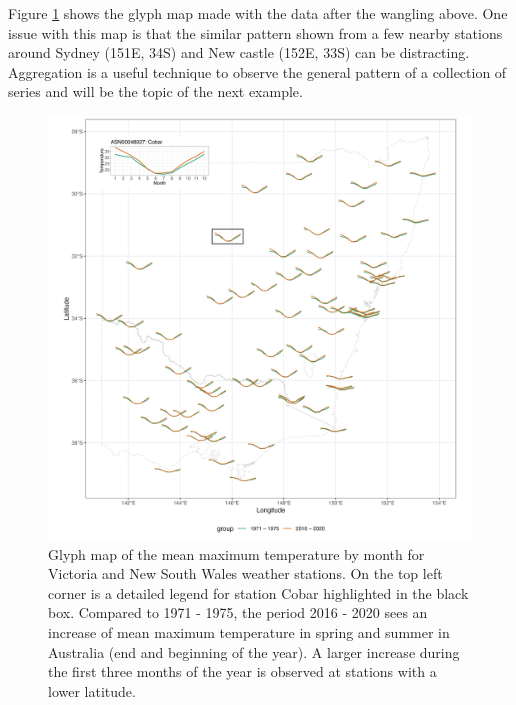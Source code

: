 \documentclass[
]{jss}
\begin{document}
Figure \ref{fig:basic-manip} shows the glyph map made with the data
after the wangling above. One issue with this map is that the similar
pattern shown from a few nearby stations around Sydney (151E, 34S) and
New castle (152E, 33S) can be distracting. Aggregation is a useful
technique to observe the general pattern of a collection of series and
will be the topic of the next example.

\begin{CodeChunk}
\begin{figure}

{\centering \includegraphics[width=1\linewidth,height=0.7\textheight]{figures/basic-manip} 

}

\caption[Glyph map of the mean maximum temperature by month for Victoria and New South Wales weather stations]{Glyph map of the mean maximum temperature by month for Victoria and New South Wales weather stations. On the top left corner is a detailed legend for station Cobar highlighted in the black box. Compared to 1971 - 1975,  the period 2016 - 2020 sees an increase of mean maximum temperature in spring and summer in Australia (end and beginning of the year). A larger increase during the first three months of the year is observed at stations with a lower latitude.}\label{fig:basic-manip}
\end{figure}
\end{CodeChunk}
\end{document}
